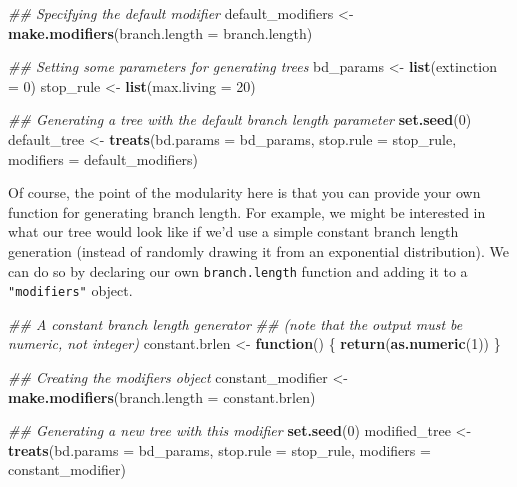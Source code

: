 \documentclass[
]{book}
\newenvironment{Shaded}{\begin{snugshade}}{\end{snugshade}}
\newcommand{\CommentTok}[1]{\textcolor[rgb]{0.56,0.35,0.01}{\textit{#1}}}
\newcommand{\ControlFlowTok}[1]{\textcolor[rgb]{0.13,0.29,0.53}{\textbf{#1}}}
\newcommand{\DataTypeTok}[1]{\textcolor[rgb]{0.13,0.29,0.53}{#1}}
\newcommand{\DecValTok}[1]{\textcolor[rgb]{0.00,0.00,0.81}{#1}}
\newcommand{\KeywordTok}[1]{\textcolor[rgb]{0.13,0.29,0.53}{\textbf{#1}}}
\newcommand{\NormalTok}[1]{#1}
\newcommand{\StringTok}[1]{\textcolor[rgb]{0.31,0.60,0.02}{#1}}
\begin{document}
\begin{Shaded}
\begin{Highlighting}[]
\CommentTok{\#\# Specifying the default modifier}
\NormalTok{default\_modifiers \textless{}{-}}\StringTok{ }\KeywordTok{make.modifiers}\NormalTok{(}\DataTypeTok{branch.length =}\NormalTok{ branch.length)}

\CommentTok{\#\# Setting some parameters for generating trees}
\NormalTok{bd\_params \textless{}{-}}\StringTok{ }\KeywordTok{list}\NormalTok{(}\DataTypeTok{extinction =} \DecValTok{0}\NormalTok{)}
\NormalTok{stop\_rule \textless{}{-}}\StringTok{ }\KeywordTok{list}\NormalTok{(}\DataTypeTok{max.living =} \DecValTok{20}\NormalTok{)}

\CommentTok{\#\# Generating a tree with the default branch length parameter}
\KeywordTok{set.seed}\NormalTok{(}\DecValTok{0}\NormalTok{)}
\NormalTok{default\_tree \textless{}{-}}\StringTok{ }\KeywordTok{treats}\NormalTok{(}\DataTypeTok{bd.params =}\NormalTok{ bd\_params,}
                     \DataTypeTok{stop.rule =}\NormalTok{ stop\_rule,}
                     \DataTypeTok{modifiers =}\NormalTok{ default\_modifiers)}
\end{Highlighting}
\end{Shaded}

Of course, the point of the modularity here is that you can provide your own function for generating branch length.
For example, we might be interested in what our tree would look like if we'd use a simple constant branch length generation (instead of randomly drawing it from an exponential distribution).
We can do so by declaring our own \texttt{branch.length} function and adding it to a \texttt{"modifiers"} object.

\begin{Shaded}
\begin{Highlighting}[]
\CommentTok{\#\# A constant branch length generator}
\CommentTok{\#\# (note that the output must be numeric, not integer)}
\NormalTok{constant.brlen \textless{}{-}}\StringTok{ }\ControlFlowTok{function}\NormalTok{() \{}
    \KeywordTok{return}\NormalTok{(}\KeywordTok{as.numeric}\NormalTok{(}\DecValTok{1}\NormalTok{))}
\NormalTok{\}}

\CommentTok{\#\# Creating the modifiers object}
\NormalTok{constant\_modifier \textless{}{-}}\StringTok{ }\KeywordTok{make.modifiers}\NormalTok{(}\DataTypeTok{branch.length =}\NormalTok{ constant.brlen)}

\CommentTok{\#\# Generating a new tree with this modifier}
\KeywordTok{set.seed}\NormalTok{(}\DecValTok{0}\NormalTok{)}
\NormalTok{modified\_tree \textless{}{-}}\StringTok{ }\KeywordTok{treats}\NormalTok{(}\DataTypeTok{bd.params =}\NormalTok{ bd\_params,}
                      \DataTypeTok{stop.rule =}\NormalTok{ stop\_rule,}
                      \DataTypeTok{modifiers =}\NormalTok{ constant\_modifier)}
\end{Highlighting}
\end{Shaded}
\end{document}
